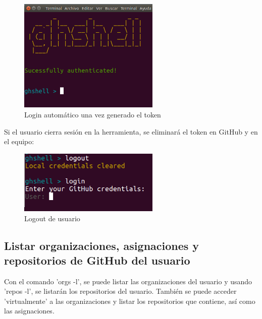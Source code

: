 		\begin{figure}[H]
		\begin{center}
		\includegraphics[width=0.6\textwidth]{images/ghshell2-4}
		\caption{Login automático una vez generado el token}
		\label{fig:ghshell2-4}
		\end{center}
		\end{figure}
		
	Si el usuario cierra sesión en la herramienta, se eliminará el token en GitHub y en el equipo:
	
		\begin{figure}[H]
		\begin{center}
		\includegraphics[width=0.6\textwidth]{images/ghshell2-2}
		\caption{Logout de usuario}
		\label{fig:ghshell2-2}
		\end{center}
		\end{figure}

\subsection{Listar organizaciones, asignaciones y repositorios de GitHub del usuario}
\label{subsec:3.1.2}   
    
    Con el comando 'orgs -l', se puede listar las organizaciones del usuario y usando 'repos -l', se listarán los repositorios del usuario. También se puede acceder 'virtualmente' a las organizaciones y listar los repositorios que contiene, así como las asignaciones.
\bigskip

